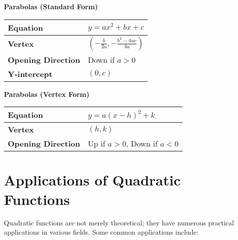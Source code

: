 \documentclass[12pt,a4paper]{article}
\begin{document}
\begin{minipage}{\textwidth}
\textbf{Parabolas (Standard Form)}

\begin{tabularx}{\textwidth}{|X|X|}
\hline
\textbf{Equation} & $y = ax^2 + bx + c$ \\
\hline
\textbf{Vertex} & $(-\frac{b}{2a}, -\frac{b^2-4ac}{4a})$ \\
\hline
\textbf{Opening Direction} & Down if $a > 0$ \\
\hline
\textbf{Y-intercept} & $(0, c)$ \\
\hline
\end{tabularx}

\textbf{Parabolas (Vertex Form)}

\begin{tabularx}{\textwidth}{|X|X|}
\hline
\textbf{Equation} & $y = a(x - h)^2 + k$ \\
\hline
\textbf{Vertex} & $(h, k)$ \\
\hline
\textbf{Opening Direction} & Up if $a > 0$, Down if $a < 0$ \\
\hline
\end{tabularx}
\end{minipage}

\newpage
\section{Applications of Quadratic Functions}

Quadratic functions are not merely theoretical; they have numerous practical applications in various fields. Some common applications include:
\end{document}
